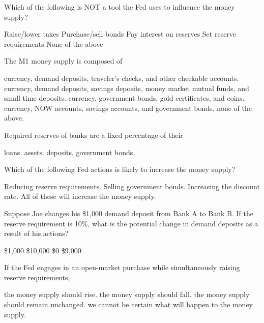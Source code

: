 \documentclass[addpoints,11pt]{exam}
\theoremstyle{definition}
\begin{document}
\begin{questions}
	
	\question Which of the following is NOT a tool the Fed uses to influence the money supply?
	
	\begin{choices}
		\CorrectChoice Raise/lower taxes
		\choice Purchase/sell bonds
		\choice Pay interest on reserves
		\choice Set reserve requirements
		\choice None of the above
	\end{choices}	

\question The M1 money supply is composed of 

\begin{choices}
	\CorrectChoice currency, demand deposits, traveler's checks, and other checkable accounts.
	\choice currency, demand deposits, savings deposits, money market mutual funds, and small time deposits.
	\choice currency, government bonds, gold certificates, and coins.
	\choice currency, NOW accounts, savings accounts, and government bonds.
	\choice none of the above.
\end{choices}

\question Required reserves of banks are a fixed percentage of their

\begin{choices}
	\choice loans.
	\choice assets.
	\CorrectChoice deposits.
	\choice government bonds.
\end{choices}

\question Which of the following Fed actions is likely to increase the money supply?

\begin{choices}
	\CorrectChoice Reducing reserve requirements.
	\choice Selling government bonds.
	\choice Increasing the discount rate.
	\choice All of these will increase the money supply.
\end{choices}

\newpage

\question Suppose Joe changes his \$1,000 demand deposit from Bank A to Bank B. If the reserve requirement is 10\%, what is the potential change in demand deposits as a result of his actions?

\begin{choices}
	\choice \$1,000
	\choice \$10,000
	\CorrectChoice \$0
	\choice \$9,000
\end{choices}

\question If the Fed engages in an open-market purchase while simultaneously raising reserve requirements,

\begin{choices}
	\choice the money supply should rise.
	\choice the money supply should fall.
	\choice the money supply should remain unchanged.
	\CorrectChoice we cannot be certain what will happen to the money supply.
\end{choices}


\end{questions}
\end{document}
